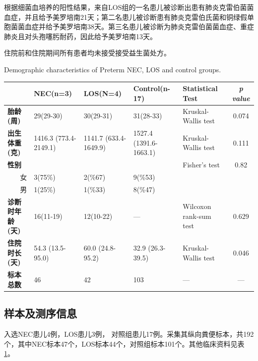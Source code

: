   根据细菌血培养的阳性结果，来自LOS组的一名患儿被诊断出患有肺炎克雷伯菌菌血症，并且给予美罗培南21天；第二名患儿被诊断患有肺炎克雷伯氏菌和铜绿假单胞菌菌血症并给予美罗培南38天。第三名患儿被诊断为肺炎克雷伯菌菌血症、重症肺炎且对头孢噻肟耐药，因此给予美罗培南13天。

  住院前和住院期间所有患者均未接受接受益生菌处方。

  \begin{table}[!hpb]
    \centering
      {Demographic characteristics of Preterm NEC, LOS and control groups.}
    \label{tab:necdemographic}
    \begin{tabular}{lp{1.8cm}p{1.8cm}p{1.8cm}p{2cm}c}
      \toprule
         & \textbf{NEC(n=3)} & \textbf{LOS(N=4)} & \textbf{Control(n-17)} & \textbf{Statistical Test} & \textit{p value} \\ \midrule
        \textbf{胎龄(周)} & 29(29-30) & 30(29-31) & 31(28-33) & Kruskal-Wallis test & 0.074 \\
        \textbf{出生体重(克)} & 1416.3 (773.4-2149.1) & 1141.7 (633.4-1649.9) & 1527.4 (1391.6-1663.1) & Kruskal-Wallis test & 0.111 \\
        \textbf{性别} &  &  &  & Fisher's test & 0.82 \\
        \multicolumn{1}{r}{女} & 3(75\%) & 2(\%67) & 9(\%53) &  & \\
        \multicolumn{1}{r}{男} & 1(25\%) & 1(\%33) & 8(\%47) &  & \\
        \textbf{诊断时年龄(天)} & 16(11-19) & 12(10-22) & — & Wilcoxon rank-sum test & 0.629 \\
        \textbf{住院时长(天)} & 54.3 (13.5-95.0) & 60.0 (24.8-95.2) & 32.9 (26.3-39.5) & Kruskal-Wallis test & 0.046 \\
        \textbf{标本总数} & 46 & 42 & 103 & — & — \\ \bottomrule
    \end{tabular}
  \end{table}

  \subsection{样本及测序信息}
  入选NEC患儿4例，LOS患儿3例， 对照组患儿17例。采集其纵向粪便标本，共192个，其中NEC标本47个，LOS标本44个，对照组标本101个。其他临床资料见表\ref{tab:necdemographic}。

